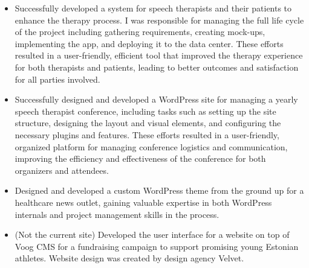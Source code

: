 {}
\begin{itemize}
\item Successfully developed a system for speech therapists and their patients to enhance the therapy process. I was responsible for managing the full life cycle of the project including gathering requirements, creating mock-ups, implementing the app, and deploying it to the data center. These efforts resulted in a user-friendly, efficient tool that improved the therapy experience for both therapists and patients, leading to better outcomes and satisfaction for all parties involved.
\end{itemize}
\smallskip
\smallskip
{}
\begin{itemize}
\item Successfully designed and developed a WordPress site for managing a yearly speech therapist conference, including tasks such as setting up the site structure, designing the layout and visual elements, and configuring the necessary plugins and features. These efforts resulted in a user-friendly, organized platform for managing conference logistics and communication, improving the efficiency and effectiveness of the conference for both organizers and attendees.
\end{itemize}
\begin{itemize}
\item Designed and developed a custom WordPress theme from the ground up for a healthcare news outlet, gaining valuable expertise in both WordPress internals and project management skills in the process.
\end{itemize}
\begin{itemize}
\item (Not the current site) Developed the user interface for a website on top of Voog CMS for a fundraising campaign to support promising young Estonian athletes. Website design was created by design agency Velvet.
\end{itemize}



